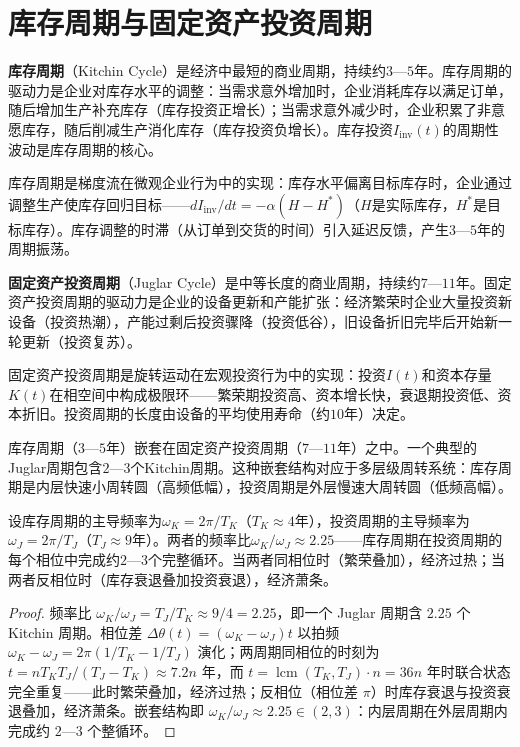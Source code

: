 \section{库存周期与固定资产投资周期}

\begin{definition}\label{def:kitchin_cycle}
\textbf{库存周期}（Kitchin Cycle）是经济中最短的商业周期，持续约$3$—$5$年。库存周期的驱动力是企业对库存水平的调整：当需求意外增加时，企业消耗库存以满足订单，随后增加生产补充库存（库存投资正增长）；当需求意外减少时，企业积累了非意愿库存，随后削减生产消化库存（库存投资负增长）。库存投资$I_{\text{inv}}(t)$的周期性波动是库存周期的核心。

库存周期是梯度流在微观企业行为中的实现：库存水平偏离目标库存时，企业通过调整生产使库存回归目标——$dI_{\text{inv}}/dt = -\alpha(H - H^*)$（$H$是实际库存，$H^*$是目标库存）。库存调整的时滞（从订单到交货的时间）引入延迟反馈，产生$3$—$5$年的周期振荡。
\end{definition}

\begin{definition}\label{def:juglar_cycle}
\textbf{固定资产投资周期}（Juglar Cycle）是中等长度的商业周期，持续约$7$—$11$年。固定资产投资周期的驱动力是企业的设备更新和产能扩张：经济繁荣时企业大量投资新设备（投资热潮），产能过剩后投资骤降（投资低谷），旧设备折旧完毕后开始新一轮更新（投资复苏）。

固定资产投资周期是旋转运动在宏观投资行为中的实现：投资$I(t)$和资本存量$K(t)$在相空间中构成极限环——繁荣期投资高、资本增长快，衰退期投资低、资本折旧。投资周期的长度由设备的平均使用寿命（约$10$年）决定。
\end{definition}

\begin{proposition}[库存周期与投资周期的嵌套结构]\label{prop:nested_business_cycles}
库存周期（$3$—$5$年）嵌套在固定资产投资周期（$7$—$11$年）之中。一个典型的Juglar周期包含$2$—$3$个Kitchin周期。这种嵌套结构对应于多层级周转系统：库存周期是内层快速小周转圆（高频低幅），投资周期是外层慢速大周转圆（低频高幅）。

设库存周期的主导频率为$\omega_K = 2\pi/T_K$（$T_K \approx 4$年），投资周期的主导频率为$\omega_J = 2\pi/T_J$（$T_J \approx 9$年）。两者的频率比$\omega_K/\omega_J \approx 2.25$——库存周期在投资周期的每个相位中完成约$2$—$3$个完整循环。当两者同相位时（繁荣叠加），经济过热；当两者反相位时（库存衰退叠加投资衰退），经济萧条。
\end{proposition}

\begin{proof}
频率比 $\omega_K/\omega_J = T_J/T_K \approx 9/4 = 2.25$，即一个 Juglar 周期含 $2.25$ 个 Kitchin 周期。相位差 $\Delta\theta(t) = (\omega_K - \omega_J)t$ 以拍频 $\omega_K - \omega_J = 2\pi(1/T_K - 1/T_J)$ 演化；两周期同相位的时刻为 $t = nT_KT_J/(T_J-T_K)\approx7.2n$ 年，而 $t = \operatorname{lcm}(T_K, T_J) \cdot n = 36n$ 年时联合状态完全重复——此时繁荣叠加，经济过热；反相位（相位差 $\pi$）时库存衰退与投资衰退叠加，经济萧条。嵌套结构即 $\omega_K/\omega_J \approx 2.25 \in (2,3)$：内层周期在外层周期内完成约 $2$—$3$ 个整循环。
\end{proof}

